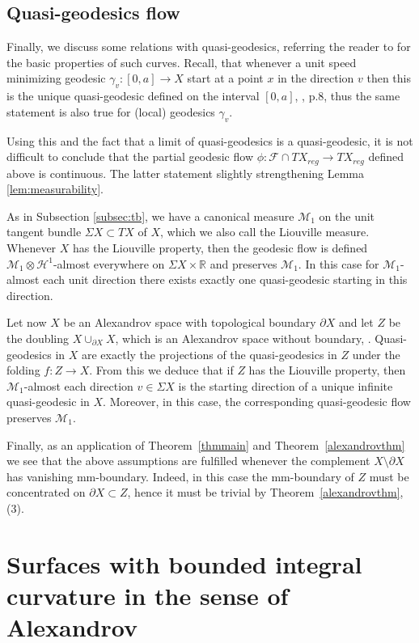 \documentclass[12pt,leqno,intlimits]{amsart}
\numberwithin{equation}{section}
\theoremstyle{definition}
\theoremstyle{remark}
\newcommand{\tref}[1]{Theorem~\ref{#1}}
\newcommand{\R}{\mathbb{R}}
\def\:{\colon}
\begin{document}
\subsection{Quasi-geodesics flow} \label{subsec:quasi}
Finally, we discuss some relations with quasi-geodesics, referring the reader to \cite{Petsemi} for the basic properties of such curves.
Recall, that whenever a unit speed minimizing geodesic $\gamma _v \:[0,a] \to X$ start at a point $x$ in the direction $v$ then this is the unique quasi-geodesic defined on the interval $[0,a]$, \cite{PP}, p.8, thus the same statement is also true for (local) geodesics $\gamma _v$.

Using this and the fact that a limit of quasi-geodesics is a quasi-geodesic, it is not difficult to conclude that the partial geodesic flow $\phi\:\mathcal F\cap TX_{reg} \to TX_{reg}$ defined above is continuous.
The latter statement slightly strengthening Lemma \ref{lem:measurability}.

As in Subsection \ref{subsec:tb}, we have a canonical measure $\mathcal M _1$ on the unit tangent bundle $\Sigma X \subset TX $ of $X$, which we also call the Liouville measure. Whenever
$X$ has the Liouville property, then the geodesic flow is defined $\mathcal M_1\otimes \mathcal H^1$-almost everywhere on $\Sigma X \times \R$ and preserves $\mathcal M_1$. In this case for $\mathcal M_1$-almost each unit direction there exists exactly one quasi-geodesic starting in this direction.

Let now $X$ be an Alexandrov space with topological boundary $\partial X$ and let $Z$ be the doubling $X\cup _{\partial X} X$, which
is an Alexandrov space without boundary, \cite{P2}.
Quasi-geodesics in $X$ are exactly the projections of the quasi-geodesics in $Z$ under
the folding $f\:Z\to X$.
From this we deduce that if $Z$ has the Liouville property, then $\mathcal M_1$-almost each direction $v\in \Sigma X$ is the starting direction of a unique infinite quasi-geodesic in $X$.
Moreover, in this case, the corresponding quasi-geodesic flow preserves $\mathcal M_1$.

Finally, as an application of \tref{thmmain} and \tref{alexandrovthm} we see that the above assumptions are fulfilled whenever the complement $X\setminus\partial X$ has vanishing  mm-boundary. Indeed, in this case the mm-boundary of $Z$ must be concentrated on $\partial X \subset Z$, hence it must be trivial by \tref{alexandrovthm},(3).

\section{Surfaces with bounded integral curvature in the sense of Alexandrov} \label{sec:surface}
\end{document}
